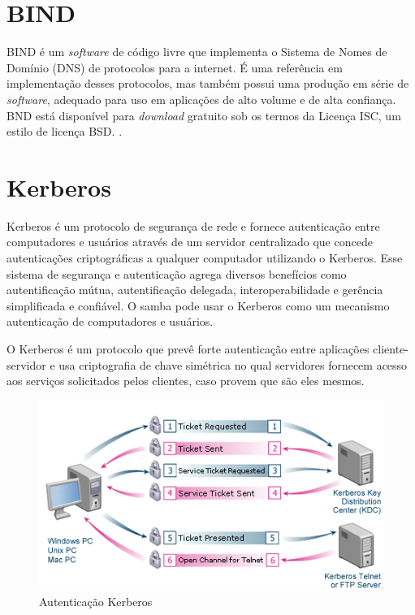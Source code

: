 \section{BIND}

BIND é um \textit{software} de código livre que implementa o Sistema de Nomes de Domínio (DNS) de protocolos para a internet. É uma referência em implementação desses protocolos, mas também possui uma produção em série de \textit{software}, adequado para uso em aplicações de alto volume e de alta confiança. BND está disponível para \textit{download} gratuito sob os termos da Licença ISC, um estilo de licença BSD. \cite{BIND}.

\section{Kerberos}

Kerberos é um protocolo de segurança de rede e fornece autenticação entre computadores e usuários através de um servidor centralizado que concede autenticações criptográficas a qualquer computador utilizando o Kerberos. Esse sistema de segurança e autenticação agrega diversos benefícios como autentificação mútua, autentificação delegada, interoperabilidade e gerência simplificada e confiável. O samba pode usar o Kerberos como um mecanismo autenticação de computadores e usuários.

O Kerberos é um protocolo que prevê forte autenticação entre aplicações cliente-servidor e usa criptografia de chave simétrica no qual servidores fornecem acesso aos serviços solicitados pelos clientes, caso provem que são eles mesmos. \cite{FILHO}

 
\begin{figure}[ht]
   	\centering
    \includegraphics[width=0.9 \textwidth]{figuras/kerberos} 
   	\caption{Autenticação Kerberos \cite{KERBEROS}}
    \label{kerberos}
\end{figure}

